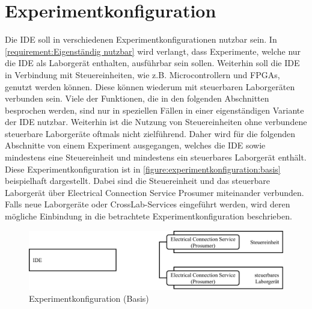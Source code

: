 \section{Experimentkonfiguration}\label{section:konzeption:experimentkonfiguration}

Die IDE soll in verschiedenen Experimentkonfigurationen nutzbar sein. In \autoref{requirement:Eigenständig nutzbar} wird verlangt, dass Experimente, welche nur die IDE als Laborgerät enthalten, ausführbar sein sollen. Weiterhin soll die IDE in Verbindung mit Steuereinheiten, wie z.B. Microcontrollern und FPGAs, genutzt werden können. Diese können wiederum mit steuerbaren Laborgeräten verbunden sein. Viele der Funktionen, die in den folgenden Abschnitten besprochen werden, sind nur in speziellen Fällen in einer eigenständigen Variante der IDE nutzbar. Weiterhin ist die Nutzung von Steuereinheiten ohne verbundene steuerbare Laborgeräte oftmals nicht zielführend. Daher wird für die folgenden Abschnitte von einem Experiment ausgegangen, welches die IDE sowie mindestens eine Steuereinheit und mindestens ein steuerbares Laborgerät enthält. Diese Experimentkonfiguration ist in \autoref{figure:experimentkonfiguration:basis} beispielhaft dargestellt. Dabei sind die Steuereinheit und das steuerbare Laborgerät über Electrical Connection Service Prosumer miteinander verbunden. Falls neue Laborgeräte oder CrossLab-Services eingeführt werden, wird deren mögliche Einbindung in die betrachtete Experimentkonfiguration beschrieben.

\begin{figure}[tbp]
    \centering
    \includegraphics[width=\textwidth]{diagrams/experimentkonfigurationen/Experimentkonfiguration-00.drawio.pdf}
    \caption{Experimentkonfiguration (Basis)}
    \label{figure:experimentkonfiguration:basis}
\end{figure}